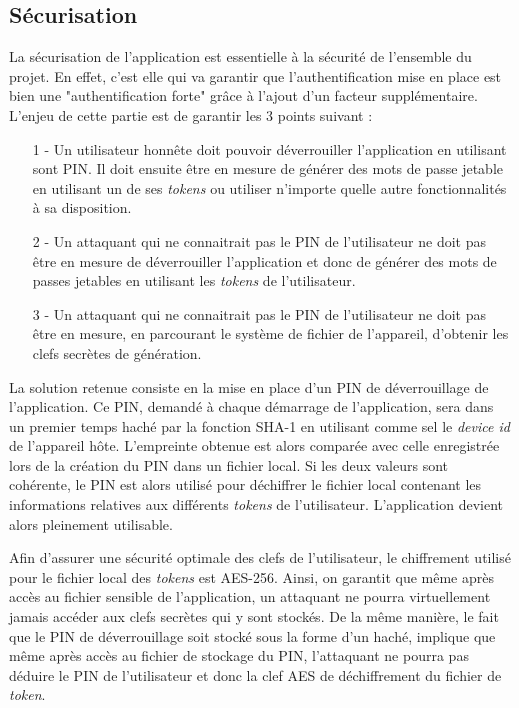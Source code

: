 \subsection{Sécurisation}
\label{secu}
La sécurisation de l'application est essentielle à la sécurité de l'ensemble du projet. En
effet, c'est elle qui va garantir que l'authentification mise en place est bien une
"authentification forte" grâce à l'ajout d'un facteur supplémentaire. L'enjeu de cette
partie est de garantir les 3 points suivant :


\begin{itemize}
  \item[1 -] Un utilisateur honnête doit pouvoir déverrouiller l'application en utilisant
  sont PIN. Il doit ensuite être en mesure de générer des mots de passe jetable en utilisant
  un de ses \emph{tokens} ou utiliser n'importe quelle autre fonctionnalités à sa
  disposition.
  \item[2 -] Un attaquant qui ne connaitrait pas le PIN de l'utilisateur ne doit pas être en
  mesure de déverrouiller l'application et donc de générer des mots de passes jetables en
  utilisant les \emph{tokens} de l'utilisateur.
  \item[3 -] Un attaquant qui ne connaitrait pas le PIN de l'utilisateur ne doit pas être en
  mesure, en parcourant le système de fichier de l'appareil, d'obtenir les clefs secrètes
  de génération.
\end{itemize}

La solution retenue consiste en la mise en place d'un PIN de déverrouillage de l'application.
Ce PIN, demandé à chaque démarrage de l'application, sera dans un premier temps haché par la
fonction SHA-1 en utilisant comme sel le \emph{device id} de l'appareil hôte. L'empreinte
obtenue est alors comparée avec celle enregistrée lors de la création du PIN dans un fichier
local. Si les deux valeurs sont cohérente, le PIN est alors utilisé pour déchiffrer le
fichier local contenant les informations relatives aux différents \emph{tokens} de
l'utilisateur. L'application devient alors pleinement utilisable.

Afin d'assurer une sécurité optimale des clefs de l'utilisateur, le chiffrement utilisé pour
le fichier local des \emph{tokens} est AES-256. Ainsi, on garantit que même après accès au
fichier sensible de l'application, un attaquant ne pourra virtuellement jamais accéder aux
clefs secrètes qui y sont stockés. De la même manière, le fait que le PIN de déverrouillage
soit stocké sous la forme d'un haché, implique que même après accès au fichier de stockage du
PIN, l'attaquant ne pourra pas déduire le PIN de l'utilisateur et donc la clef AES de
déchiffrement du fichier de \emph{token}.




